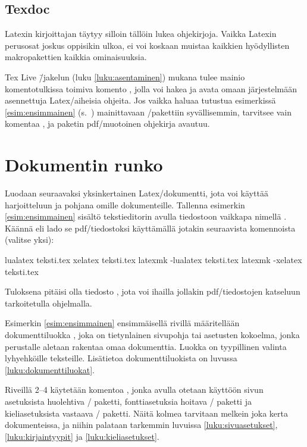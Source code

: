 \subsection{Texdoc}

Latexin kirjoittajan täytyy silloin tällöin lukea ohjekirjoja. Vaikka
Latexin perusosat joskus oppisikin ulkoa, ei voi koskaan muistaa
kaikkien hyödyllisten makropakettien kaikkia ominaisuuksia.

Tex Live \=/jakelun (luku \ref{luku:asentaminen}) mukana tulee mainio
komentotulkissa toimiva komento , jolla voi hakea ja avata
omaan järjestelmään asennettuja Latex\-/aiheisia ohjeita. Jos vaikka
haluaa tutustua esimerkissä \ref{esim:ensimmainen}
(s.~\pageref{esim:ensimmainen}) mainittavaan
\-/pakettiin syvällisemmin, tarvitsee vain komentaa
, ja paketin pdf\-/muotoinen ohjekirja avautuu.

\section{Dokumentin runko}

Luodaan seuraavaksi yksinkertainen Latex\-/dokumentti, jota voi käyttää
harjoitteluun ja pohjana omille dokumenteille. Tallenna esimerkin
\ref{esim:ensimmainen} sisältö tekstieditorin avulla tiedostoon vaikkapa
nimellä . Käännä eli lado se pdf\-/tiedostoksi
käyttämällä jotakin seuraavista komennoista (valitse yksi):

\begin{koodilohkosis}
  lualatex teksti.tex
  xelatex  teksti.tex
  latexmk -lualatex teksti.tex
  latexmk -xelatex  teksti.tex
\end{koodilohkosis}

Tuloksena pitäisi olla tiedosto , jota voi ihailla
jollakin pdf\-/tiedostojen katseluun tarkoitetulla ohjelmalla.

Esimerkin \ref{esim:ensimmainen} ensimmäisellä rivillä määritellään
dokumenttiluokka , joka on tietynlainen sivupohja tai
asetusten kokoelma, jonka perustalle aletaan rakentaa omaa dokumenttia.
Luokka  on tyypillinen valinta lyhyehköille teksteille.
Lisätietoa dokumenttiluokista on luvussa \ref{luku:dokumenttiluokat}.

Riveillä 2--4 käytetään komentoa , jonka avulla
otetaan käyttöön sivun asetuksista huolehtiva \-/
paketti, fonttiasetuksia hoitava \-/ paketti ja
kieliasetuksista vastaava \-/ paketti. Näitä kolmea
tarvitaan melkein joka kerta dokumenteissa, ja niihin palataan tarkemmin
luvuissa \ref{luku:sivuasetukset}, \ref{luku:kirjaintyypit} ja
\ref{luku:kieliasetukset}.

